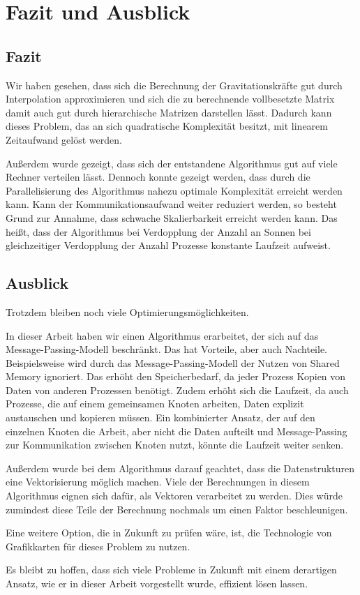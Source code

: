 \chapter{Fazit und Ausblick}
\label{chp:Conclusions}
  \section{Fazit}
    Wir haben gesehen, dass sich die Berechnung der Gravitationskräfte gut durch Interpolation approximieren und sich die zu berechnende vollbesetzte Matrix damit auch gut durch hierarchische Matrizen
    darstellen lässt. Dadurch kann dieses Problem, das an sich quadratische Komplexität besitzt, mit linearem Zeitaufwand gelöst werden.
    
    Außerdem wurde gezeigt, dass sich der entstandene Algorithmus gut auf viele Rechner verteilen lässt.
    Dennoch konnte gezeigt werden, dass durch die Parallelisierung des Algorithmus nahezu optimale Komplexität erreicht werden kann. Kann der Kommunikationsaufwand weiter reduziert werden, so besteht
    Grund zur Annahme, dass schwache Skalierbarkeit erreicht werden kann. Das heißt, dass der Algorithmus bei Verdopplung der Anzahl an Sonnen bei gleichzeitiger Verdopplung der Anzahl Prozesse 
    konstante Laufzeit aufweist.
    
  \section{Ausblick}
    Trotzdem bleiben noch viele Optimierungsmöglichkeiten. 
    
    In dieser Arbeit haben wir einen Algorithmus erarbeitet, der sich auf das Message-Passing-Modell beschränkt. Das hat Vorteile,
    aber auch Nachteile. Beispielsweise wird durch das Message-Passing-Modell der Nutzen von Shared Memory ignoriert. Das erhöht den Speicherbedarf, da jeder Prozess Kopien von Daten von anderen
    Prozessen benötigt. Zudem erhöht sich die Laufzeit, da auch Prozesse, die auf einem gemeinsamen Knoten arbeiten, Daten explizit austauschen und kopieren müssen. Ein kombinierter Ansatz,
    der auf den einzelnen Knoten die Arbeit, aber nicht die Daten aufteilt und Message-Passing zur Kommunikation zwischen Knoten nutzt, könnte die Laufzeit weiter senken.
    
    Außerdem wurde bei dem Algorithmus darauf geachtet, dass die Datenstrukturen eine Vektorisierung möglich machen. Viele der Berechnungen in diesem Algorithmus eignen sich dafür, als Vektoren
    verarbeitet zu werden. Dies würde zumindest diese Teile der Berechnung nochmals um einen Faktor beschleunigen.
    
    Eine weitere Option, die in Zukunft zu prüfen wäre, ist, die Technologie von Grafikkarten für dieses Problem zu nutzen.
    
    Es bleibt zu hoffen, dass sich viele Probleme in Zukunft mit einem derartigen Ansatz, wie er in dieser Arbeit vorgestellt wurde, effizient lösen lassen.